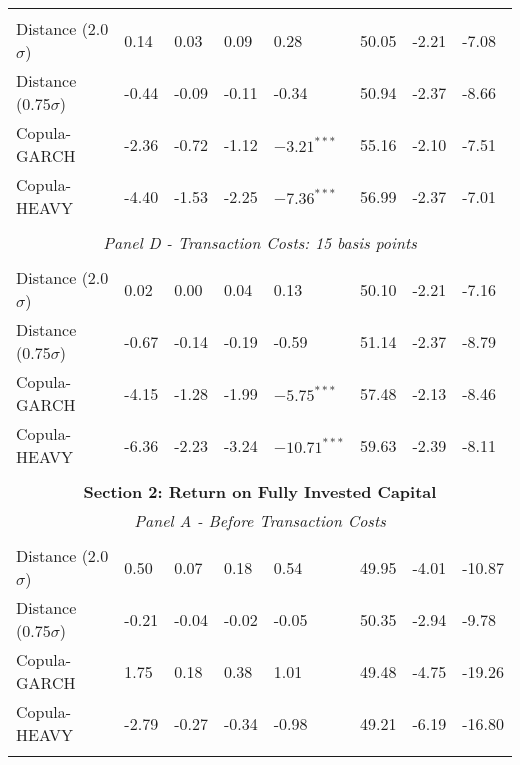 \documentclass[a4paper,12pt]{report}
\begin{document}
\begin{refsection}
\begin{threeparttable}[H]
\begin{tabularx}{\textwidth}{@{\extracolsep{\fill}}llllllll@{}}
		&       &       &       &       &       &       &  \\
		Distance (2.0$\sigma$) & 0.14  & 0.03  & 0.09  & 0.28  & 50.05 & -2.21  & -7.08 \\
		Distance (0.75$\sigma$) & -0.44 & -0.09 & -0.11 & -0.34 & 50.94 & -2.37  & -8.66 \\
		Copula-GARCH & -2.36 & -0.72 & -1.12 & $-3.21^{***}$ & 55.16 & -2.10  & -7.51 \\
		Copula-HEAVY & -4.40 & -1.53 & -2.25 & $-7.36^{***}$ & 56.99 & -2.37  & -7.01 \\
		\multicolumn{1}{r}{} & \multicolumn{1}{r}{} & \multicolumn{1}{r}{} & \multicolumn{1}{r}{} & \multicolumn{1}{r}{} & \multicolumn{1}{r}{} & \multicolumn{1}{r}{} & \multicolumn{1}{r}{} \\
		\multicolumn{8}{c}{\textit{Panel D - Transaction Costs: 15 basis points}} \\
		&       &       &       &       &       &       &  \\
		Distance (2.0$\sigma$) & 0.02  & 0.00  & 0.04  & 0.13  & 50.10 & -2.21  & -7.16 \\
		Distance (0.75$\sigma$) & -0.67 & -0.14 & -0.19 & -0.59 & 51.14 & -2.37  & -8.79 \\
		Copula-GARCH & -4.15 & -1.28 & -1.99 & $-5.75^{***}$ & 57.48 & -2.13  & -8.46 \\
		Copula-HEAVY & -6.36 & -2.23 & -3.24 & $-10.71^{***}$ & 59.63 & -2.39  & -8.11 \\
		\multicolumn{1}{r}{} & \multicolumn{1}{r}{} & \multicolumn{1}{r}{} & \multicolumn{1}{r}{} & \multicolumn{1}{r}{} & \multicolumn{1}{r}{} & \multicolumn{1}{r}{} & \multicolumn{1}{r}{} \\
		\midrule
		\multicolumn{8}{c}{\textbf{Section 2: Return on Fully Invested Capital}} \\
		\multicolumn{8}{c}{\textit{Panel A - Before Transaction Costs}} \\
		&       &       &       &       &       &       &  \\
		Distance (2.0$\sigma$) & 0.50  & 0.07  & 0.18  & 0.54  & 49.95 & -4.01  & -10.87 \\
		Distance (0.75$\sigma$) & -0.21 & -0.04 & -0.02 & -0.05 & 50.35 &  -2.94  & -9.78 \\
		Copula-GARCH & 1.75  & 0.18  & 0.38  & 1.01  & 49.48 & -4.75  & -19.26 \\
		Copula-HEAVY & -2.79 & -0.27 & -0.34 & -0.98 & 49.21 & -6.19  & -16.80 \\
		\multicolumn{1}{r}{} & \multicolumn{1}{r}{} & \multicolumn{1}{r}{} & \multicolumn{1}{r}{} & \multicolumn{1}{r}{} & \multicolumn{1}{r}{} & \multicolumn{1}{r}{} & \multicolumn{1}{r}{} \\

\end{tabularx}
\end{threeparttable}
\end{refsection}
\end{document}
